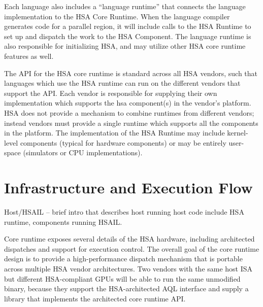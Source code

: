 Each language also includes a “language runtime” that connects the
language implementation to the HSA Core Runtime.   When the language
compiler generates code for a parallel region, it will include calls
to the HSA Runtime to set up and dispatch the work to the HSA
Component.   The language runtime is also responsible for
initializing HSA, and may utilize other HSA core runtime features as
well.  

The API for the HSA core runtime is standard across all HSA vendors,
such that languages which use the HSA runtime can run on the
different vendors that support the API.  Each vendor is responsible
for supplying their own implementation which supports the hsa
component(s) in the vendor’s platform.   HSA does not provide a
mechanism to combine runtimes from different vendors; instead
vendors must provide a single runtime which supports all the
components in the platform.
The implementation of the HSA Runtime may include kernel-level
components (typical for hardware components) or may be entirely
user-space (simulators or CPU implementations).     

\hypertarget{glue}{}\section{ Infrastructure and Execution
Flow}\label{glue}

Host/HSAIL – brief intro that describes host running host code
include HSA runtime, components running HSAIL.

Core runtime exposes several details of the HSA hardware,
including architected dispatches and support for execution control.
The overall goal of the core runtime design is to provide a
high-\/performance dispatch mechanism that is portable across
multiple H\-S\-A vendor architectures. Two vendors with the same
host I\-S\-A but different H\-S\-A-\/compliant G\-P\-Us will be able
to run the same unmodified binary, because they support the
H\-S\-A-\/architected A\-Q\-L interface and supply a library
that implements the architected core runtime A\-P\-I. 

